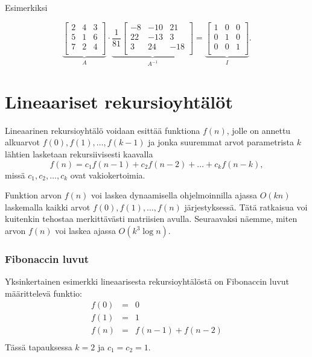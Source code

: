 Esimerkiksi

\[
\underbrace{
 \begin{bmatrix}
  2 & 4 & 3\\
  5 & 1 & 6\\
  7 & 2 & 4\\
 \end{bmatrix}
}_{A}
\cdot
\underbrace{
 \frac{1}{81}
 \begin{bmatrix}
   -8 & -10 & 21 \\
   22 & -13 & 3 \\
   3 & 24 & -18 \\
 \end{bmatrix}
}_{A^{-1}}
=
\underbrace{
 \begin{bmatrix}
  1 & 0 & 0 \\
  0 & 1 & 0 \\
  0 & 0 & 1 \\
 \end{bmatrix}
}_{I}.
\]

\section{Lineaariset rekursioyhtälöt}


Lineaarinen rekursioyhtälö 
voidaan esittää funktiona $f(n)$,
jolle on annettu alkuarvot
$f(0),f(1),\ldots,f(k-1)$
ja jonka suuremmat arvot
parametrista $k$ lähtien lasketaan
rekursiivisesti kaavalla
\[f(n) = c_1 f(n-1) + c_2 f(n-2) + \ldots + c_k f (n-k),\]
missä $c_1,c_2,\ldots,c_k$ ovat vakiokertoimia.

Funktion arvon $f(n)$ voi laskea dynaamisella
ohjelmoinnilla ajassa $O(kn)$
laskemalla kaikki arvot $f(0),f(1),\ldots,f(n)$ järjestyksessä.
Tätä ratkaisua voi kuitenkin tehostaa merkittävästi
matriisien avulla.
Seuraavaksi näemme, miten arvon $f(n)$
voi laskea ajassa $O(k^3 \log n)$.

\subsubsection{Fibonaccin luvut}


Yksinkertainen esimerkki lineaarisesta rekursioyhtälöstä
on Fibonaccin luvut määrittelevä funktio:
\[
\begin{array}{lcl}
f(0) & = & 0 \\
f(1) & = & 1 \\
f(n) & = & f(n-1)+f(n-2) \\
\end{array}
\]
Tässä tapauksessa $k=2$ ja $c_1=c_2=1$.

